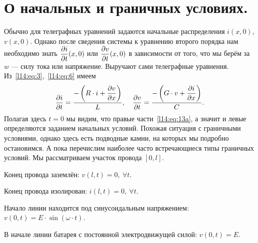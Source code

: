 \section{О начальных и граничных условиях.}
\label{lecture14section2}
Обычно для телеграфных уравнений задаются начальные распределения $i(x,0)$, $v(x,0)$. Однако после сведения системы к уравнению второго порядка нам необходимо знать $\displaystyle\frac{\partial i}{\partial t}(x,0)$ или $\displaystyle\frac{\partial v}{\partial t}(x,0)$ в зависимости от того, что мы берём за $w$ --- силу тока или напряжение. Выручают сами телеграфные уравнения. Из~\eqref{l14:eq:3},~\eqref{l14:eq:6} имеем 
\begin{equation}\label{l14:eq:13a}
	\frac{\partial i}{\partial t}=\displaystyle\frac{\displaystyle-\left(R\cdot i+\frac{\partial v}{\partial x}\right)}{L},\quad \frac{\partial v}{\partial t}=\displaystyle\frac{\displaystyle-\left(G\cdot v+\frac{\partial i}{\partial x}\right)}{C}.  
\end{equation}
Полагая здесь $t=0$ мы видим, что правые части~\eqref{l14:eq:13a}, а значит и левые определяются заданием начальных условий. Похожая ситуация с граничными условиями, однако здесь есть подводные камни, на которых мы подробно остановимся. А пока перечислим наиболее часто встречающиеся типы граничных условий. Мы рассматриваем участок провода $[0,l]$.
\begin{enumerateD}
	\item Конец провода заземлён: $v(l,t)=0,\ \forall t$.
	\item Конец провода изолирован: $i(l,t)=0,\ \forall t$.
	\item Начало линии находится под синусоидальным напряжением: $v(0,t)=E\cdot\sin\left(\omega\cdot t\right)$.
	\item В начале линии батарея с постоянной электродвижущей силой: $v(0,t)=E$.
\end{enumerateD}

